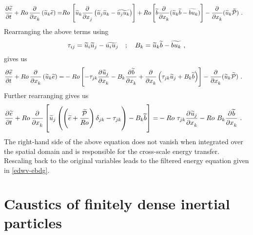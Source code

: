 \documentclass[../Rajarshi-thesis-draft.tex]{subfiles}
\begin{document}
\begin{align}
 \begin{split}
 \frac{\partial^{}  \widetilde{e}}{\partial t^{}} + Ro\,\frac{\partial^{} }{\partial x_k^{}} \left(\widetilde{u}_k \widetilde{e}\right) = &Ro\, \left[\widetilde{u}_k \frac{\partial^{} }{\partial x_j^{}} \left(\widetilde{u}_j\widetilde{u}_k - \widetilde{u_j u_k}\right)\right]+ Ro\left[\widetilde{b} \frac{\partial^{} }{\partial x_k^{}} (\widetilde{u}_k\widetilde{b} - \widetilde{b u_k})\right] - \frac{\partial^{} }{\partial x_k^{}}(\widetilde{u}_k\widetilde{\mathcal{P}}) \ .
 \end{split}
\end{align}
Rearranging the above terms using 
\begin{align}
 \label{edwv-lstrs}
 \begin{split}
 \tau_{ij} = \widetilde{u}_i \widetilde{u}_j - \widetilde{u_i u_j} \quad ;\quad B_k = \widetilde{u}_k\widetilde{b} - \widetilde{b u_k} \ ,
 \end{split}
\end{align}
gives us 
\begin{align}
 \begin{split}
 \frac{\partial^{} \widetilde{e}}{\partial t^{}} + Ro\,\frac{\partial^{} }{\partial x_k^{}}\left(\widetilde{u}_k \widetilde{e}\right) = &-Ro\left[- \tau_{jk}\frac{\partial^{} \widetilde{u}_j }{\partial x_k^{}}- B_k\frac{\partial^{} \widetilde{b}}{\partial x_k^{}} + \frac{\partial^{} }{\partial x_k^{}}\left(\tau_{jk} \widetilde{u}_j + B_k \widetilde{b}\right) \right]  - \frac{\partial^{} }{\partial x_k^{}}(\widetilde{u}_k\widetilde{\mathcal{P}}) \ .
 \end{split}
\end{align}
Further rearranging gives us 
\begin{align}
 \label{edwv-sclflux}
 \begin{split}
 \frac{\partial^{} \widetilde{e}}{\partial t^{}} + Ro\,\frac{\partial^{} }{\partial x_k^{}} \left[\widetilde{u}_j \left(\left(\widetilde{e}+\frac{\widetilde{\mathcal{P}}}{Ro}\right)\delta_{jk} - \tau_{jk}\right) - B_k \widetilde{b}\right] = &-Ro ~\tau_{jk}\frac{\partial^{} \widetilde{u}_j}{\partial x_k^{}} - Ro~B_k\frac{\partial^{} \widetilde{b}}{\partial x_k^{}} \ .
 \end{split}
\end{align}
The right-hand side of the above equation does not vanish when integrated over the spatial domain and is responsible for the cross-scale energy transfer. Rescaling back to the original variables leads to the filtered energy equation given in \eqref{edwv-ebdg}.
\endgroup

\chapter{Caustics of finitely dense inertial particles}
\end{document}
